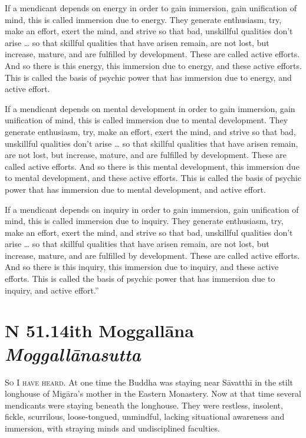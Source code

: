 \documentclass[12pt,openany]{book}%
\newcommand*{\suttatitleacronym}[1]{\smaller[2]{#1}\vspace*{.3em}}
\newcommand*{\suttatitletranslation}[1]{\linebreak{#1}}
\newcommand*{\suttatitleroot}[1]{\linebreak\smaller[2]\itshape{#1}}
\newcommand*{\tocacronym}[1]{\hspace*{-3.3em}{#1}\quad}
\newcommand*{\toctranslation}[1]{#1}
\newcommand*{\tocroot}[1]{(\textit{#1})}
\newcommand*{\scevam}[1]{\textsc{#1}}
\begin{document}
If a mendicant depends on energy in order to gain immersion, gain unification of mind, this is called immersion due to energy. They generate enthusiasm, try, make an effort, exert the mind, and strive so that bad, unskillful qualities don’t arise … so that skillful qualities that have arisen remain, are not lost, but increase, mature, and are fulfilled by development. These are called active efforts. And so there is this energy, this immersion due to energy, and these active efforts. This is called the basis of psychic power that has immersion due to energy, and active effort. 

If a mendicant depends on mental development in order to gain immersion, gain unification of mind, this is called immersion due to mental development. They generate enthusiasm, try, make an effort, exert the mind, and strive so that bad, unskillful qualities don’t arise … so that skillful qualities that have arisen remain, are not lost, but increase, mature, and are fulfilled by development. These are called active efforts. And so there is this mental development, this immersion due to mental development, and these active efforts. This is called the basis of psychic power that has immersion due to mental development, and active effort. 

If a mendicant depends on inquiry in order to gain immersion, gain unification of mind, this is called immersion due to inquiry. They generate enthusiasm, try, make an effort, exert the mind, and strive so that bad, unskillful qualities don’t arise … so that skillful qualities that have arisen remain, are not lost, but increase, mature, and are fulfilled by development. These are called active efforts. And so there is this inquiry, this immersion due to inquiry, and these active efforts. This is called the basis of psychic power that has immersion due to inquiry, and active effort.” 

%
\section*{{\suttatitleacronym SN 51.14}{\suttatitletranslation With Moggallāna }{\suttatitleroot Moggallānasutta}}
\addcontentsline{toc}{section}{\tocacronym{SN 51.14} \toctranslation{With Moggallāna } \tocroot{Moggallānasutta}}

\scevam{So I have heard. }At one time the Buddha was staying near \textsanskrit{Sāvatthī} in the stilt longhouse of \textsanskrit{Migāra}’s mother in the Eastern Monastery. Now at that time several mendicants were staying beneath the longhouse. They were restless, insolent, fickle, scurrilous, loose-tongued, unmindful, lacking situational awareness and immersion, with straying minds and undisciplined faculties. 
\end{document}
